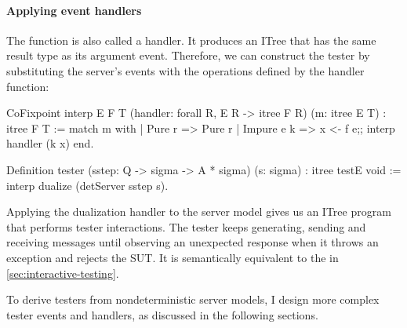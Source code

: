 \paragraph{Applying event handlers}
The  function is also called a handler.  It produces an ITree that
has the same result type as its argument event.  Therefore, we can construct the
tester by substituting the server's events with the operations defined by the
handler function:
\begin{coq}
  CoFixpoint interp {E F T} (handler: forall {R}, E R -> itree F R) (m: itree E T)
             : itree F T :=
    match m with
    | Pure   r   => Pure r
    | Impure e k => x <- f e;;
                    interp handler (k x)
    end.

  Definition tester (sstep: Q -> sigma -> A * sigma) (s: sigma) : itree testE void :=
    interp dualize (detServer sstep s).
\end{coq}
Applying the dualization handler to the server model gives us an ITree program
that performs tester interactions.  The tester keeps generating, sending and
receiving messages until observing an unexpected response when it throws an
exception and rejects the SUT.  It is semantically equivalent to the
 in \autoref{sec:interactive-testing}.

To derive testers from nondeterministic server models, I design more complex
tester events and handlers, as discussed in the following sections.
